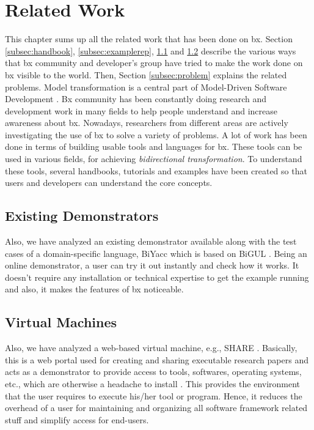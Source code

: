 \section{Related Work}\label{sec:relatedwork}
This chapter sums up all the related work that has been done on bx. Section \ref{subsec:handbook}, \ref{subsec:examplerep}, \ref{subsec:existingdemo} and \ref{subsec:virtualmachines} describe the various ways that bx community and developer's group have tried to make the work done on bx visible to the world. Then, Section \ref{subsec:problem} explains the related problems. 
\newline\newline Model transformation is a central part of Model-Driven Software Development \cite{bx-grace} \cite{bx-dagstuhl}. Bx community has been constantly doing research and development work in many fields to help people understand and increase awareness about bx. Nowadays, researchers from different areas are actively investigating the use of bx to solve a variety of problems. A lot of work has been done in terms of building usable tools and languages for bx. These tools can be used in various fields, for achieving \textit{bidirectional transformation}. To understand these tools, several handbooks, tutorials and examples have been created so that users and developers can understand the core concepts. 
\subsection{Existing Demonstrators}\label{subsec:existingdemo}
Also, we have analyzed an existing demonstrator available along with the test cases of a domain-specific language, BiYacc \cite{biyacc} which is based on BiGUL \cite{bigul}. 
\newline\newline Being an online demonstrator, a user can try it out instantly and check how it works. It doesn't require any installation or technical expertise to get the example running and also, it makes the features of bx noticeable.

\subsection{Virtual Machines}\label{subsec:virtualmachines}
Also, we have analyzed a web-based virtual machine, e.g., SHARE \cite{share}. Basically, this is a web portal used for creating and sharing executable research papers and acts as a demonstrator to provide access to tools, softwares, operating systems, etc., which are otherwise a headache to install \cite{share}. 
\newline\newline This provides the environment that the user requires to execute his/her tool or program. Hence, it reduces the overhead of a user for maintaining and organizing all software framework related stuff and simplify access for end-users.


